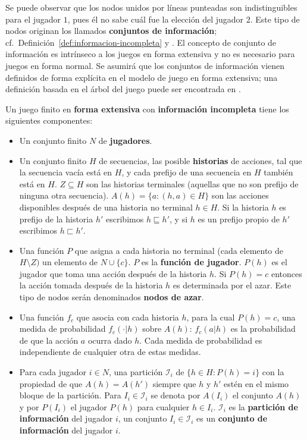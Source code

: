 Se puede observar que los nodos unidos por líneas punteadas son indistinguibles para el jugador $1$, pues él no sabe cuál fue la elección del jugador $2$. Este tipo de nodos originan los llamados \textbf{conjuntos de información}; cf.\ Definición~\ref{def:informacion-incompleta} y \cite[p.~200]{bib:course-game-theory}. El concepto de conjunto de información es intrínseco a los juegos en forma extensiva y no es necesario para juegos en forma normal. Se asumirá que los conjuntos de información vienen definidos de forma explícita en el modelo de juego en forma extensiva; una definición basada en el árbol del juego puede ser encontrada en \cite{bib:conceptos-basicos}.

\begin{definition}
\label{def:informacion-incompleta}
Un juego finito en \textbf{forma extensiva} con \textbf{información incompleta} tiene los siguientes componentes:
\begin{itemize}[]
  \item Un conjunto finito $N$ de \textbf{jugadores}.
  \item Un conjunto finito $H$ de secuencias, las posible \textbf{historias} de acciones, tal que la secuencia vacía está en $H$, y cada prefijo de una secuencia en $H$ también está en $H$. $Z \subseteq H$ son las historias terminales (aquellas que no son prefijo de ninguna otra secuencia). $A(h) = \{ a : (h, a) \in H \}$ son las acciones disponibles después de una historia no terminal $h \in H$. Si la historia $h$ es prefijo de la historia $h'$ escribimos $h\sqsubseteq h'$, y si $h$ es un prefijo propio de $h'$ escribimos $h\sqsubset h'$.
  \item Una función $P$ que asigna a cada historia no terminal (cada elemento de $H \setminus Z)$ un elemento de $N \cup \{c \}$. $P$ es la \textbf{función de jugador}. $P(h)$ es el jugador que toma una acción después de la historia $h$. Si $P(h) = c$ entonces la acción tomada después de la historia $h$ es determinada por el azar. Este tipo de nodos serán denominados \textbf{nodos de azar}.
  \item Una función $f_c$ que asocia con cada historia $h$, para la cual $P(h) = c$, una medida de probabilidad $f_c(\cdot|h)$ sobre $A(h)$: $f_c(a|h)$ es la probabilidad de que la acción $a$ ocurra dado $h$.  Cada medida de probabilidad es independiente de cualquier otra de estas medidas.
  \item Para cada jugador $i \in N$, una partición $\mathcal{I}_i$ de $\{h \in H : P(h) = i\}$ con la propiedad de que $A(h) = A(h')$ siempre que $h$ y $h'$ estén en el mismo bloque de la partición. Para $I_i \in \mathcal{I}_i$ se denota por $A(I_i)$ el conjunto $A(h)$ y por $P(I_i)$ el jugador $P(h)$ para cualquier $h \in I_i$. $\mathcal{I}_i$ es la \textbf{partición de información} del jugador $i$, un conjunto $I_i \in \mathcal{I}_i$ es un \textbf{conjunto de información} del jugador $i$.

\end{itemize}
\end{definition}
